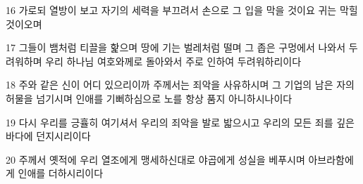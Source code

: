 \par 16 가로되 열방이 보고 자기의 세력을 부끄려서 손으로 그 입을 막을 것이요 귀는 막힐 것이오며
\par 17 그들이 뱀처럼 티끌을 핥으며 땅에 기는 벌레처럼 떨며 그 좁은 구멍에서 나와서 두려워하며 우리 하나님 여호와께로 돌아와서 주로 인하여 두려워하리이다
\par 18 주와 같은 신이 어디 있으리이까 주께서는 죄악을 사유하시며 그 기업의 남은 자의 허물을 넘기시며 인애를 기뻐하심으로 노를 항상 품지 아니하시나이다
\par 19 다시 우리를 긍휼히 여기셔서 우리의 죄악을 발로 밟으시고 우리의 모든 죄를 깊은 바다에 던지시리이다
\par 20 주께서 옛적에 우리 열조에게 맹세하신대로 야곱에게 성실을 베푸시며 아브라함에게 인애를 더하시리이다


